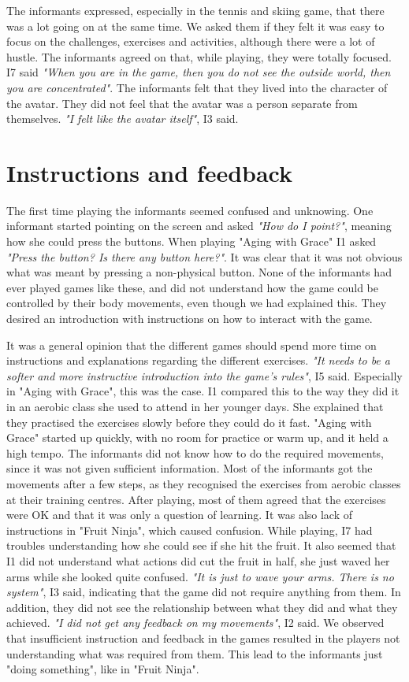 The informants expressed, especially in the tennis and skiing game, that there was a lot going on at the same time. We asked them if they felt it was easy to focus on the challenges, exercises and activities, although there were a lot of hustle. The informants agreed on that, while playing, they were totally focused. I7 said \emph{"When you are in the game, then you do not see the outside world, then you are concentrated"}. The informants felt that they lived into the character of the avatar. They did not feel that the avatar was a person separate from themselves. \emph{"I felt like the avatar itself"}, I3 said. 

\section{Instructions and feedback}
The first time playing the informants seemed confused and unknowing. One informant started pointing on the screen and asked \emph{"How do I point?"}, meaning how she could press the buttons. When playing "Aging with Grace" I1 asked \emph{"Press the button? Is there any button here?"}. It was clear that it was not obvious what was meant by pressing a non-physical button. None of the informants had ever played games like these, and did not understand how the game could be controlled by their body movements, even though we had explained this. They desired an introduction with instructions on how to interact with the game.

It was a general opinion that the different games should spend more time on instructions and explanations regarding the different exercises. \emph{"It needs to be a softer and more instructive introduction into the game's rules"}, I5 said. Especially in "Aging with Grace", this was the case. I1 compared this to the way they did it in an aerobic class she used to attend in her younger days. She explained that they practised the exercises slowly before they could do it fast. "Aging with Grace" started up quickly, with no room for practice or warm up, and it held a high tempo. The informants did not know how to do the required movements, since it was not given sufficient information. Most of the informants got the movements after a few steps, as they recognised the exercises from aerobic classes at their training centres. After playing, most of them agreed that the exercises were OK and that it was only a question of learning. It was also lack of instructions in "Fruit Ninja", which caused confusion. While playing, I7 had troubles understanding how she could see if she hit the fruit. It also seemed that I1 did not understand what actions did cut the fruit in half, she just waved her arms while she looked quite confused. \emph{"It is just to wave your arms. There is no system"}, I3 said, indicating that the game did not require anything from them. In addition, they did not see the relationship between what they did and what they achieved. \emph{"I did not get any feedback on my movements"}, I2 said. We observed that insufficient instruction and feedback in the games resulted in the players not understanding what was required from them. This lead to the informants just "doing something", like in "Fruit Ninja". 

